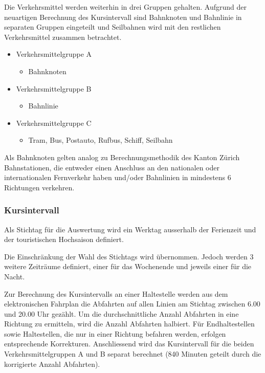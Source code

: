 Die Verkehrsmittel werden weiterhin in drei Gruppen gehalten.
Aufgrund der neuartigen Berechnung des Kursintervall sind Bahnknoten und Bahnlinie in separaten Gruppen eingeteilt und Seilbahnen wird mit den restlichen Verkehrsmittel zusammen betrachtet.

\begin{itemize}[noitemsep]
    \item Verkehrsmittelgruppe A
    \begin{itemize}
        \item Bahnknoten
    \end{itemize}
    \item Verkehrsmittelgruppe B
    \begin{itemize}
        \item Bahnlinie
    \end{itemize}
    \item Verkehrsmittelgruppe C
    \begin{itemize}
        \item Tram, Bus, Postauto, Rufbus, Schiff, Seilbahn
    \end{itemize}
\end{itemize}

Als Bahnknoten gelten analog zu Berechnungsmethodik des Kanton Zürich Bahnstationen, die entweder einen Anschluss an den nationalen oder internationalen Fernverkehr haben und/oder Bahnlinien in mindestens 6 Richtungen verkehren. 

\subsubsection{Kursintervall}
\label{Zusammenhang zur Berechnungsmethodik ARE:Kursintervall}

\begin{itquote}
Als Stichtag für die Auswertung wird ein Werktag ausserhalb der Ferienzeit und der touristischen Hochsaison definiert.
\end{itquote}

Die Einschränkung der Wahl des Stichtags wird übernommen.
Jedoch werden 3 weitere Zeiträume definiert, einer für das Wochenende und jeweils einer für die Nacht.

\begin{itquote}
Zur Berechnung des Kursintervalls an einer Haltestelle werden aus dem elektronischen Fahrplan die Abfahrten auf allen Linien am Stichtag zwischen 6.00 und 20.00 Uhr gezählt.
Um die durchschnittliche Anzahl Abfahrten in eine Richtung zu ermitteln, wird die Anzahl Abfahrten halbiert.
Für Endhaltestellen sowie Haltestellen, die nur in einer Richtung befahren werden, erfolgen entsprechende Korrekturen.
Anschliessend wird das Kursintervall für die beiden Verkehrsmittelgruppen A und B separat berechnet (840 Minuten geteilt durch die korrigierte Anzahl Abfahrten).
\end{itquote}

